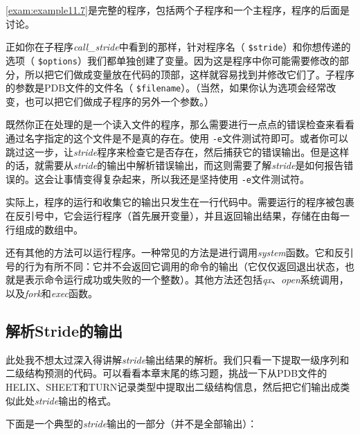 \autoref{exam:example11.7}是完整的程序，包括两个子程序和一个主程序，程序的后面是讨论。



正如你在子程序\textit{call\_stride}中看到的那样，针对程序名（ \verb|$stride|）和你想传递的选项（ \verb|$options|）我们都单独创建了变量。因为这是程序中你可能需要修改的部分，所以把它们做成变量放在代码的顶部，这样就容易找到并修改它们了。子程序的参数是PDB文件的文件名（ \verb|$filename|）。（当然，如果你认为选项会经常改变，也可以把它们做成子程序的另外一个参数。）

既然你正在处理的是一个读入文件的程序，那么需要进行一点点的错误检查来看看通过名字指定的这个文件是不是真的存在。使用 \verb|-e|文件测试符即可。或者你可以跳过这一步，让\textit{stride}程序来检查它是否存在，然后捕获它的错误输出。但是这样的话，就需要从\textit{stride}的输出中解析错误输出，而这则需要了解\textit{stride}是如何报告错误的。这会让事情变得复杂起来，所以我还是坚持使用 \verb|-e|文件测试符。

实际上，程序的运行和收集它的输出只发生在一行代码中。需要运行的程序被包裹在反引号中，它会运行程序（首先展开变量），并且返回输出结果，存储在由每一行组成的数组中。

还有其他的方法可以运行程序。一种常见的方法是进行调用\textit{system}函数。它和反引号的行为有所不同：它并不会返回它调用的命令的输出（它仅仅返回退出状态，也就是表示命令运行成功或失败的一个整数）。其他方法还包括\textit{qx}、\textit{open}系统调用，以及\textit{fork}和\textit{exec}函数。

\subsection{解析Stride的输出}
此处我不想太过深入得讲解\textit{stride}输出结果的解析。我们只看一下提取一级序列和二级结构预测的代码。可以看看本章末尾的练习题，挑战一下从PDB文件的HELIX、SHEET和TURN记录类型中提取出二级结构信息，然后把它们输出成类似此处\textit{stride}输出的格式。

下面是一个典型的\textit{stride}输出的一部分（并不是全部输出）：

